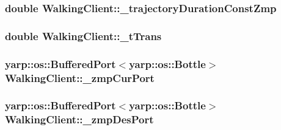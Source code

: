 \hypertarget{classWalkingClient_aa6b3bf5c2ed923a7a33a9ed461713d98}{
\subsubsection[{\-\_\-trajectory\-Duration\-Const\-Zmp}]{\setlength{\rightskip}{0pt plus 5cm}double {\bf \-Walking\-Client\-::\-\_\-trajectory\-Duration\-Const\-Zmp}}}\label{classWalkingClient_aa6b3bf5c2ed923a7a33a9ed461713d98}
\hypertarget{classWalkingClient_a144518766ec4eb9eeab230fcb291e20c}{
\subsubsection[{\-\_\-t\-Trans}]{\setlength{\rightskip}{0pt plus 5cm}double {\bf \-Walking\-Client\-::\-\_\-t\-Trans}}}\label{classWalkingClient_a144518766ec4eb9eeab230fcb291e20c}
\hypertarget{classWalkingClient_a546e6830e43d19ba7d8a8e808e28ef53}{
\subsubsection[{\-\_\-zmp\-Cur\-Port}]{\setlength{\rightskip}{0pt plus 5cm}yarp\-::os\-::\-Buffered\-Port$<$yarp\-::os\-::\-Bottle$>$ {\bf \-Walking\-Client\-::\-\_\-zmp\-Cur\-Port}}}\label{classWalkingClient_a546e6830e43d19ba7d8a8e808e28ef53}
\hypertarget{classWalkingClient_acbac3e142471448b50dd605e4217b0d0}{
\subsubsection[{\-\_\-zmp\-Des\-Port}]{\setlength{\rightskip}{0pt plus 5cm}yarp\-::os\-::\-Buffered\-Port$<$yarp\-::os\-::\-Bottle$>$ {\bf \-Walking\-Client\-::\-\_\-zmp\-Des\-Port}}}\label{classWalkingClient_acbac3e142471448b50dd605e4217b0d0}
